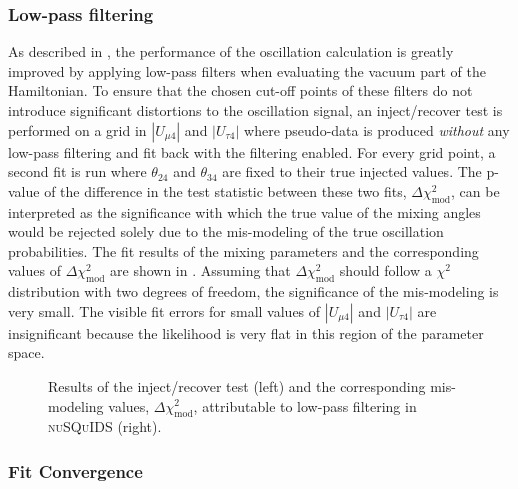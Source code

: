 \subsubsection{Low-pass filtering}
As described in , the performance of the oscillation calculation is greatly improved by applying low-pass filters when evaluating the vacuum part of the Hamiltonian. To ensure that the chosen cut-off points of these filters do not introduce significant distortions to the oscillation signal, an inject/recover test is performed on a grid in $|U_{\mu 4}|$ and $|U_{\tau 4}|$ where pseudo-data is produced \emph{without} any low-pass filtering and fit back with the filtering enabled. For every grid point, a second fit is run where $\theta_{24}$ and $\theta_{34}$ are fixed to their true injected values. The p-value of the difference in the test statistic between these two fits, $\Delta \chi^2_{\mathrm{mod}}$, can be interpreted as the significance with which the true value of the mixing angles would be rejected solely due to the mis-modeling of the true oscillation probabilities. The fit results of the mixing parameters and the corresponding values of $\Delta \chi^2_{\mathrm{mod}}$ are shown in . Assuming that $\Delta \chi^2_{\mathrm{mod}}$ should follow a $\chi^2$ distribution with two degrees of freedom, the significance of the mis-modeling is very small. The visible fit errors for small values of $|U_{\mu 4}|$ and $|U_{\tau 4}|$ are insignificant because the likelihood is very flat in this region of the parameter space.

\begin{figure}
    \centering
    \caption{Results of the inject/recover test (left) and the corresponding mis-modeling values, $\Delta \chi^2_{\mathrm{mod}}$, attributable to low-pass filtering in \textsc{nuSQuIDS} (right).}
    \label{fig:asimov-test-sterile-ana}
\end{figure}

\subsubsection{Fit Convergence}


